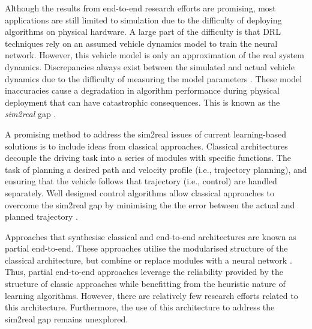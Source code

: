 
Although the results from end-to-end research efforts are promising, most applications are still limited to simulation due to the difficulty of deploying algorithms on physical hardware.
A large part of the difficulty is that DRL techniques rely on an assumed vehicle dynamics model to train the neural network.
However, this vehicle model is only an approximation of the real system dynamics. 
Discrepancies always exist between the simulated and actual vehicle dynamics due to the difficulty of measuring the model parameters \cite{Hewing2018}. 
These model inaccuracies cause a degradation in algorithm performance during physical deployment that can have catastrophic consequences.
This is known as the \emph{sim2real} gap \cite{Ivanov2020}.


A promising method to address the sim2real issues of current learning-based solutions is to include ideas from classical approaches. 
Classical architectures decouple the driving task into a series of modules with specific functions.
The task of planning a desired path and velocity profile (i.e., trajectory planning), and ensuring that the vehicle follows that trajectory (i.e., control) are handled separately. 
Well designed control algorithms allow classical approaches to overcome the sim2real gap by minimising the the error between the actual and planned trajectory \cite{Betz2021}. 

Approaches that synthesise classical and end-to-end architectures are known as partial end-to-end.
These approaches utilise the modularised structure of the classical architecture, but combine or replace modules with a neural network \cite{Weiss2020}.
Thus, partial end-to-end approaches leverage the reliability provided by the structure of classic approaches while benefitting from the heuristic nature of learning algorithms.
However, there are relatively few research efforts related to this architecture.
Furthermore, the use of this architecture to address the sim2real gap remains unexplored.


